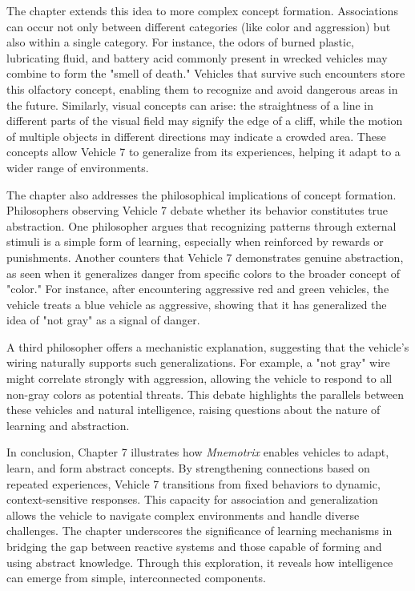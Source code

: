 \documentclass{article}
\begin{document}
    The chapter extends this idea to more complex concept formation. Associations can occur not only between different categories (like color and aggression) but also within a single category. For instance, the odors of burned plastic, lubricating fluid, and battery acid commonly present in wrecked vehicles may combine to form the "smell of death." Vehicles that survive such encounters store this olfactory concept, enabling them to recognize and avoid dangerous areas in the future. Similarly, visual concepts can arise: the straightness of a line in different parts of the visual field may signify the edge of a cliff, while the motion of multiple objects in different directions may indicate a crowded area. These concepts allow Vehicle 7 to generalize from its experiences, helping it adapt to a wider range of environments.  

    The chapter also addresses the philosophical implications of concept formation. Philosophers observing Vehicle 7 debate whether its behavior constitutes true abstraction. One philosopher argues that recognizing patterns through external stimuli is a simple form of learning, especially when reinforced by rewards or punishments. Another counters that Vehicle 7 demonstrates genuine abstraction, as seen when it generalizes danger from specific colors to the broader concept of "color." For instance, after encountering aggressive red and green vehicles, the vehicle treats a blue vehicle as aggressive, showing that it has generalized the idea of "not gray" as a signal of danger.  

    A third philosopher offers a mechanistic explanation, suggesting that the vehicle's wiring naturally supports such generalizations. For example, a "not gray" wire might correlate strongly with aggression, allowing the vehicle to respond to all non-gray colors as potential threats. This debate highlights the parallels between these vehicles and natural intelligence, raising questions about the nature of learning and abstraction.  

    In conclusion, Chapter 7 illustrates how \textit{Mnemotrix} enables vehicles to adapt, learn, and form abstract concepts. By strengthening connections based on repeated experiences, Vehicle 7 transitions from fixed behaviors to dynamic, context-sensitive responses. This capacity for association and generalization allows the vehicle to navigate complex environments and handle diverse challenges. The chapter underscores the significance of learning mechanisms in bridging the gap between reactive systems and those capable of forming and using abstract knowledge. Through this exploration, it reveals how intelligence can emerge from simple, interconnected components.
\end{document}
